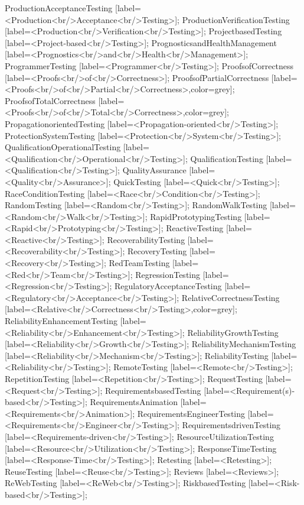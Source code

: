 \documentclass{article}
\begin{document}
{ProductionAcceptanceTesting [label=<Production<br/>Acceptance<br/>Testing>];
ProductionVerificationTesting [label=<Production<br/>Verification<br/>Testing>];
ProjectbasedTesting [label=<Project-based<br/>Testing>];
PrognosticsandHealthManagement [label=<Prognostics<br/>and<br/>Health<br/>Management>];
ProgrammerTesting [label=<Programmer<br/>Testing>];
ProofsofCorrectness [label=<Proofs<br/>of<br/>Correctness>];
ProofsofPartialCorrectness [label=<Proofs<br/>of<br/>Partial<br/>Correctness>,color=grey];
ProofsofTotalCorrectness [label=<Proofs<br/>of<br/>Total<br/>Correctness>,color=grey];
PropagationorientedTesting [label=<Propagation-oriented<br/>Testing>];
ProtectionSystemTesting [label=<Protection<br/>System<br/>Testing>];
QualificationOperationalTesting [label=<Qualification<br/>Operational<br/>Testing>];
QualificationTesting [label=<Qualification<br/>Testing>];
QualityAssurance [label=<Quality<br/>Assurance>];
QuickTesting [label=<Quick<br/>Testing>];
RaceConditionTesting [label=<Race<br/>Condition<br/>Testing>];
RandomTesting [label=<Random<br/>Testing>];
RandomWalkTesting [label=<Random<br/>Walk<br/>Testing>];
RapidPrototypingTesting [label=<Rapid<br/>Prototyping<br/>Testing>];
ReactiveTesting [label=<Reactive<br/>Testing>];
RecoverabilityTesting [label=<Recoverability<br/>Testing>];
RecoveryTesting [label=<Recovery<br/>Testing>];
RedTeamTesting [label=<Red<br/>Team<br/>Testing>];
RegressionTesting [label=<Regression<br/>Testing>];
RegulatoryAcceptanceTesting [label=<Regulatory<br/>Acceptance<br/>Testing>];
RelativeCorrectnessTesting [label=<Relative<br/>Correctness<br/>Testing>,color=grey];
ReliabilityEnhancementTesting [label=<Reliability<br/>Enhancement<br/>Testing>];
ReliabilityGrowthTesting [label=<Reliability<br/>Growth<br/>Testing>];
ReliabilityMechanismTesting [label=<Reliability<br/>Mechanism<br/>Testing>];
ReliabilityTesting [label=<Reliability<br/>Testing>];
RemoteTesting [label=<Remote<br/>Testing>];
RepetitionTesting [label=<Repetition<br/>Testing>];
RequestTesting [label=<Request<br/>Testing>];
RequirementsbasedTesting [label=<Requirement(s)-based<br/>Testing>];
RequirementsAnimation [label=<Requirements<br/>Animation>];
RequirementsEngineerTesting [label=<Requirements<br/>Engineer<br/>Testing>];
RequirementsdrivenTesting [label=<Requirements-driven<br/>Testing>];
ResourceUtilizationTesting [label=<Resource<br/>Utilization<br/>Testing>];
ResponseTimeTesting [label=<Response-Time<br/>Testing>];
Retesting [label=<Retesting>];
ReuseTesting [label=<Reuse<br/>Testing>];
Reviews [label=<Reviews>];
ReWebTesting [label=<ReWeb<br/>Testing>];
RiskbasedTesting [label=<Risk-based<br/>Testing>];
}
\end{document}

